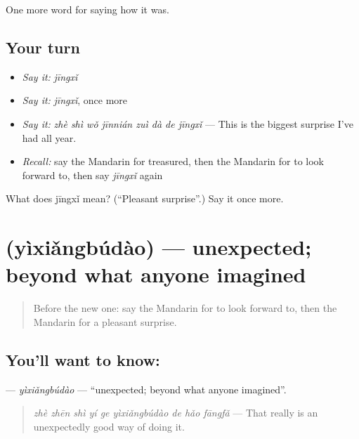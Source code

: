 \begin{grammarlens}[title={What you've built}]
One more word for saying how it was.
\end{grammarlens}

\subsection*{Your turn}
\begin{itemize}
\raggedright
  \item \emph{Say it:} \emph{jīngxǐ}
  \item \emph{Say it:} \emph{jīngxǐ}, once more
  \item \emph{Say it:} \emph{zhè shì wǒ jīnnián zuì dà de jīngxǐ} — This is the biggest surprise I've had all year.
  \item \emph{Recall:} say the Mandarin for treasured, then the Mandarin for to look forward to, then say \emph{jīngxǐ} again
\end{itemize}

\begin{tcolorbox}[breakable,colback=teal!4,colframe=teal!35!black,title={Before you move on}]
What does jīngxǐ mean? (\textquotedblleft{}Pleasant surprise\textquotedblright{}.) Say it once more.
\end{tcolorbox}
\section[\texorpdfstring{\zh{意想不到} (yìxiǎngbúdào)}{意想不到 (yìxiǎngbúdào)}]{ (yìxiǎngbúdào) — unexpected; beyond what anyone imagined}

\label{lesson:ZH-C462-yixiangbudao}



\begin{quote}
Before the new one: say the Mandarin for to look forward to, then the Mandarin for a pleasant surprise.
\end{quote}

\subsection*{You'll want to know: }
\textbf{} — \emph{yìxiǎngbúdào} — \textquotedblleft{}unexpected; beyond what anyone imagined\textquotedblright{}.

\begin{quote}
\textbf{} \emph{zhè zhēn shì yí ge yìxiǎngbúdào de hǎo fāngfǎ} — That really is an unexpectedly good way of doing it.
\end{quote}

